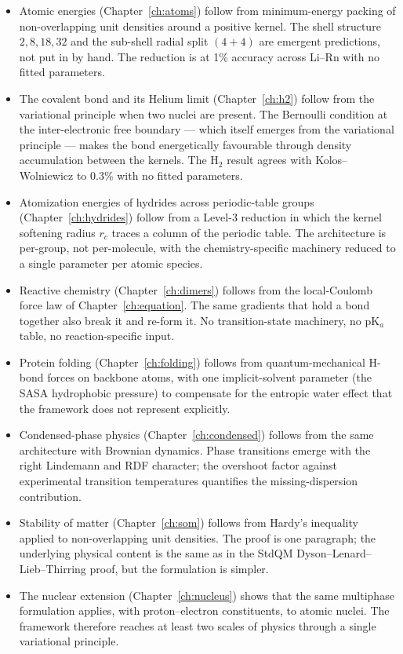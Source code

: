 \begin{itemize}
\item Atomic energies (Chapter~\ref{ch:atoms}) follow from minimum-energy packing of non-overlapping unit densities around a positive kernel. The shell structure $2, 8, 18, 32$ and the sub-shell radial split $(4{+}4)$ are emergent predictions, not put in by hand. The reduction is at 1\% accuracy across Li--Rn with no fitted parameters.

\item The covalent bond and its Helium limit (Chapter~\ref{ch:h2}) follow from the variational principle when two nuclei are present. The Bernoulli condition at the inter-electronic free boundary --- which itself emerges from the variational principle --- makes the bond energetically favourable through density accumulation between the kernels. The H$_2$ result agrees with Kolos--Wolniewicz to 0.3\% with no fitted parameters.

\item Atomization energies of hydrides across periodic-table groups (Chapter~\ref{ch:hydrides}) follow from a Level-3 reduction in which the kernel softening radius $r_c$ traces a column of the periodic table. The architecture is per-group, not per-molecule, with the chemistry-specific machinery reduced to a single parameter per atomic species.

\item Reactive chemistry (Chapter~\ref{ch:dimers}) follows from the local-Coulomb force law of Chapter~\ref{ch:equation}. The same gradients that hold a bond together also break it and re-form it. No transition-state machinery, no pK$_a$ table, no reaction-specific input.

\item Protein folding (Chapter~\ref{ch:folding}) follows from quantum-mechanical H-bond forces on backbone atoms, with one implicit-solvent parameter (the SASA hydrophobic pressure) to compensate for the entropic water effect that the framework does not represent explicitly.

\item Condensed-phase physics (Chapter~\ref{ch:condensed}) follows from the same architecture with Brownian dynamics. Phase transitions emerge with the right Lindemann and RDF character; the overshoot factor against experimental transition temperatures quantifies the missing-dispersion contribution.

\item Stability of matter (Chapter~\ref{ch:som}) follows from Hardy's inequality applied to non-overlapping unit densities. The proof is one paragraph; the underlying physical content is the same as in the StdQM Dyson--Lenard--Lieb--Thirring proof, but the formulation is simpler.

\item The nuclear extension (Chapter~\ref{ch:nucleus}) shows that the same multiphase formulation applies, with proton--electron constituents, to atomic nuclei. The framework therefore reaches at least two scales of physics through a single variational principle.
\end{itemize}

